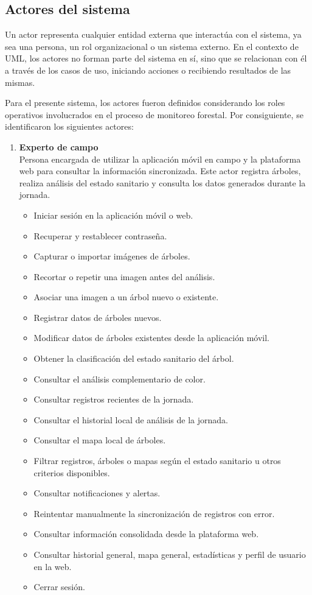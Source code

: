 \newpage
\subsection{Actores del sistema}
Un actor representa cualquier entidad externa que interactúa con el sistema, ya sea una persona, un rol organizacional o un sistema externo. En el contexto de UML, los actores no forman parte del sistema en sí, sino que se relacionan con él a través de los casos de uso, iniciando acciones o recibiendo resultados de las mismas.

Para el presente sistema, los actores fueron definidos considerando los roles operativos involucrados en el proceso de monitoreo forestal. Por consiguiente, se identificaron los siguientes actores:

\begin{enumerate}
    \item \textbf{Experto de campo}\\
    Persona encargada de utilizar la aplicación móvil en campo y la plataforma web para consultar la información sincronizada. Este actor registra árboles, realiza análisis del estado sanitario y consulta los datos generados durante la jornada.
        \begin{itemize}
            \item Iniciar sesión en la aplicación móvil o web.
            \item Recuperar y restablecer contraseña.
            \item Capturar o importar imágenes de árboles.
            \item Recortar o repetir una imagen antes del análisis.
            \item Asociar una imagen a un árbol nuevo o existente.
            \item Registrar datos de árboles nuevos.
            \item Modificar datos de árboles existentes desde la aplicación móvil.
            \item Obtener la clasificación del estado sanitario del árbol.
            \item Consultar el análisis complementario de color.
            \item Consultar registros recientes de la jornada.
            \item Consultar el historial local de análisis de la jornada.
            \item Consultar el mapa local de árboles.
            \item Filtrar registros, árboles o mapas según el estado sanitario u otros criterios disponibles.
            \item Consultar notificaciones y alertas.
            \item Reintentar manualmente la sincronización de registros con error.
            \item Consultar información consolidada desde la plataforma web.
            \item Consultar historial general, mapa general, estadísticas y perfil de usuario en la web.
            \item Cerrar sesión.
        \end{itemize}


\end{enumerate}
